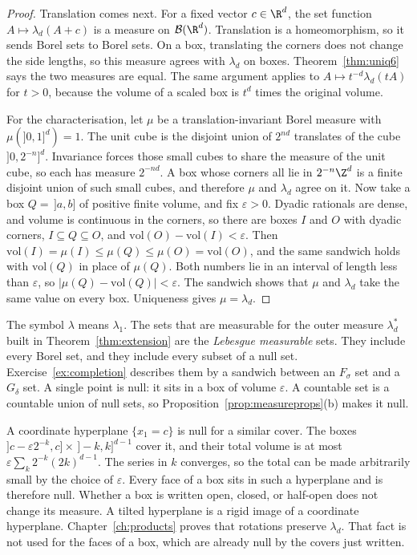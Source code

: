 \begin{proof}
Translation comes next.
For a fixed vector $c\in\R^d$, the set function $A\mapsto\lambda_d(A+c)$ is a measure on $\mathcal B(\R^d)$.
Translation is a homeomorphism, so it sends Borel sets to Borel sets.
On a box, translating the corners does not change the side lengths, so this measure agrees with $\lambda_d$ on boxes.
Theorem~\ref{thm:uniq6} says the two measures are equal.
The same argument applies to $A\mapsto t^{-d}\lambda_d(tA)$ for $t>0$, because the volume of a scaled box is $t^d$ times the original volume.

For the characterisation, let $\mu$ be a translation-invariant Borel measure with $\mu(]0,1]^d)=1$.
The unit cube is the disjoint union of $2^{nd}$ translates of the cube $]0,2^{-n}]^d$.
Invariance forces those small cubes to share the measure of the unit cube, so each has measure $2^{-nd}$.
A box whose corners all lie in $2^{-n}\Z^d$ is a finite disjoint union of such small cubes, and therefore $\mu$ and $\lambda_d$ agree on it.
Now take a box $Q=\,]a,b]$ of positive finite volume, and fix $\varepsilon>0$.
Dyadic rationals are dense, and volume is continuous in the corners, so there are boxes $I$ and $O$ with dyadic corners, $I\subseteq Q\subseteq O$, and $\mathrm{vol}(O)-\mathrm{vol}(I)<\varepsilon$.
Then $\mathrm{vol}(I)=\mu(I)\le\mu(Q)\le\mu(O)=\mathrm{vol}(O)$, and the same sandwich holds with $\mathrm{vol}(Q)$ in place of $\mu(Q)$.
Both numbers lie in an interval of length less than $\varepsilon$, so $|\mu(Q)-\mathrm{vol}(Q)|<\varepsilon$.
The sandwich shows that $\mu$ and $\lambda_d$ take the same value on every box.
Uniqueness gives $\mu=\lambda_d$.
\end{proof}

The symbol $\lambda$ means $\lambda_1$.
The sets that are measurable for the outer measure $\lambda_d^*$ built in Theorem~\ref{thm:extension} are the \emph{Lebesgue measurable} sets.
They include every Borel set, and they include every subset of a null set.
Exercise~\ref{ex:completion} describes them by a sandwich between an $F_\sigma$ set and a $G_\delta$ set.
A single point is null: it sits in a box of volume $\varepsilon$.
A countable set is a countable union of null sets, so Proposition~\ref{prop:measureprops}(b) makes it null.

A coordinate hyperplane $\{x_1=c\}$ is null for a similar cover.
The boxes $]c-\varepsilon 2^{-k},c]\times\,]-k,k]^{d-1}$ cover it, and their total volume is at most $\varepsilon\sum_k 2^{-k}(2k)^{d-1}$.
The series in $k$ converges, so the total can be made arbitrarily small by the choice of $\varepsilon$.
Every face of a box sits in such a hyperplane and is therefore null.
Whether a box is written open, closed, or half-open does not change its measure.
A tilted hyperplane is a rigid image of a coordinate hyperplane.
Chapter~\ref{ch:products} proves that rotations preserve $\lambda_d$.
That fact is not used for the faces of a box, which are already null by the covers just written.

